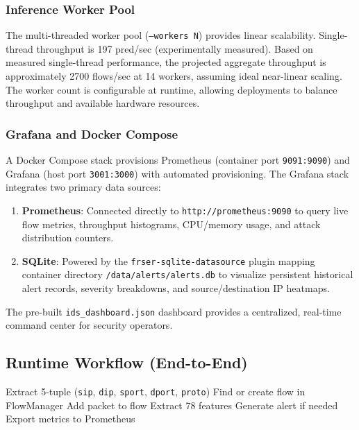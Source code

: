 \documentclass[12pt,a4paper]{article}
\begin{document}
\subsubsection{Inference Worker Pool}
\label{sec:sup_pool}

The multi-threaded worker pool (\texttt{--workers N}) provides linear scalability. Single-thread throughput is 197 pred/sec (experimentally measured). Based on measured single-thread performance, the projected aggregate throughput is approximately 2700 flows/sec at 14 workers, assuming ideal near-linear scaling. The worker count is configurable at runtime, allowing deployments to balance throughput and available hardware resources.

\subsubsection{Grafana and Docker Compose}
\label{sec:sup_grafana}

A Docker Compose stack provisions Prometheus (container port \texttt{9091:9090}) and Grafana (host port \texttt{3001:3000}) with automated provisioning. The Grafana stack integrates two primary data sources:
\begin{enumerate}
    \item \textbf{Prometheus}: Connected directly to \texttt{http://prometheus:9090} to query live flow metrics, throughput histograms, CPU/memory usage, and attack distribution counters.
    \item \textbf{SQLite}: Powered by the \texttt{frser-sqlite-datasource} plugin mapping container directory \texttt{/data/alerts/alerts.db} to visualize persistent historical alert records, severity breakdowns, and source/destination IP heatmaps.
\end{enumerate}
The pre-built \texttt{ids\_dashboard.json} dashboard provides a centralized, real-time command center for security operators.

\subsection{Runtime Workflow (End-to-End)}

\begin{algorithm}[H]
\caption{Runtime Packet Processing Workflow}
\label{alg:runtime}
\begin{algorithmic}[1]
    \State Extract 5-tuple (\texttt{sip}, \texttt{dip}, \texttt{sport}, \texttt{dport}, \texttt{proto})
    \State Find or create flow in FlowManager
    \State Add packet to flow
        \State Extract 78 features
        \State {} 
        \State Generate alert if needed
        \State Export metrics to Prometheus
    \EndIf
\EndProcedure
\end{algorithmic}
\end{algorithm}
\end{document}
